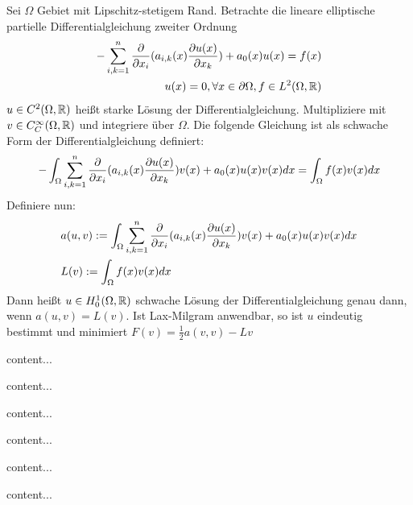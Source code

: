 \begin{satz}
	Sei $\Omega$ Gebiet mit Lipschitz-stetigem Rand. Betrachte die lineare elliptische partielle Differentialgleichung zweiter Ordnung
	\begin{align*}
		- \sum_{i,k = 1}^{n} \frac{\partial }{\partial x_i}(a_{i,k}(x) \frac{\partial u(x)}{\partial x_k}) + a_0(x)u(x) = f(x) \\
		u(x) = 0, \forall x \in \partial \Omega, f \in L^2(\Omega,\mathbb{R})
	\end{align*}
	$u \in C^2(\Omega,\mathbb{R})$ heißt starke Lösung der Differentialgleichung.
	Multipliziere mit $v \in C_C^\infty(\Omega,\mathbb{R})$ und integriere über $\Omega$. Die folgende Gleichung ist als schwache Form der Differentialgleichung definiert:
	\begin{align*}
		- \int_{\Omega} \sum_{i,k = 1}^{n} \frac{\partial }{\partial x_i}(a_{i,k}(x) \frac{\partial u(x)}{\partial x_k}) v(x) + a_0(x)u(x) v(x) dx = \int_\Omega f(x) v(x) dx
	\end{align*}
	Definiere nun:
	\begin{align*}
		&a(u,v) := \int_{\Omega} \sum_{i,k = 1}^{n} \frac{\partial }{\partial x_i}(a_{i,k}(x) \frac{\partial u(x)}{\partial x_k}) v(x) + a_0(x)u(x) v(x) dx \\
		&L(v) := \int_\Omega f(x)v(x) dx
	\end{align*}
	Dann heißt $u \in H^1_0(\Omega,\mathbb{R})$ schwache Lösung  der Differentialgleichung genau dann, wenn $a(u,v) = L(v)$. Ist Lax-Milgram anwendbar, so ist $u$ eindeutig bestimmt und minimiert $F(v) = \frac{1}{2} a(v,v) - Lv$
\end{satz}

\begin{definition}
	content...
\end{definition}

\begin{satz}
	content...
\end{satz}

\begin{satz}
	content...
\end{satz}

\begin{definition}[Eigenfunktionen]
	content...
\end{definition}

\begin{definition}[Faltung]
	content...
\end{definition}


\begin{definition}[Distribution]
	content...
\end{definition}

\pagebreak